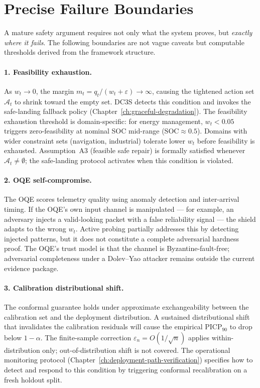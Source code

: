 \section{Precise Failure Boundaries}
\label{sec:precise-failure-boundaries}

A mature safety argument requires not only what the system proves, but
\emph{exactly where it fails}.  The following boundaries are not vague
caveats but computable thresholds derived from the framework structure.

\paragraph{1. Feasibility exhaustion.}
As $w_t \to 0$, the margin $m_t = q_t / (w_t + \varepsilon) \to \infty$,
causing the tightened action set $\mathcal{A}_t$ to shrink toward the
empty set.  DC3S detects this condition and invokes the safe-landing
fallback policy (Chapter~\ref{ch:graceful-degradation}).  The feasibility
exhaustion threshold is domain-specific: for energy management, $w_t < 0.05$
triggers zero-feasibility at nominal SOC mid-range ($\mathrm{SOC} \approx 0.5$).
Domains with wider constraint sets (navigation, industrial) tolerate lower
$w_t$ before feasibility is exhausted.  Assumption~A3 (feasible safe repair)
is formally satisfied whenever $\mathcal{A}_t \ne \emptyset$; the
safe-landing protocol activates when this condition is violated.

\paragraph{2. OQE self-compromise.}
The OQE scores telemetry quality using anomaly detection and inter-arrival
timing.  If the OQE's own input channel is manipulated --- for example, an
adversary injects a valid-looking packet with a false reliability signal
--- the shield adapts to the wrong $w_t$.  Active probing
partially addresses this by detecting injected patterns, but it does not
constitute a complete adversarial hardness proof.  The OQE's trust model is
that the channel is Byzantine-fault-free; adversarial completeness under a
Dolev--Yao attacker remains outside the current evidence package.

\paragraph{3. Calibration distributional shift.}
The conformal guarantee holds under approximate exchangeability between the
calibration set and the deployment distribution.  A sustained distributional
shift that invalidates the calibration residuals will cause the empirical
$\mathrm{PICP}_{90}$ to drop below $1 - \alpha$.  The finite-sample
correction $\varepsilon_n = O(1/\sqrt{n})$ applies within-distribution
only; out-of-distribution shift is not covered.  The operational monitoring
protocol (Chapter~\ref{ch:deployment-path-verification}) specifies how to
detect and respond to this condition by triggering conformal recalibration
on a fresh holdout split.

